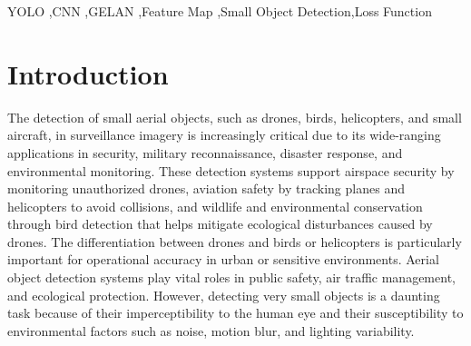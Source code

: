 \documentclass[preprint,review,12pt]{elsarticle}
\begin{document}
\begin{frontmatter}


\begin{keyword}
YOLO \sep CNN \sep GELAN \sep Feature Map \sep Small Object Detection\sep Loss Function


\end{keyword}

\end{frontmatter}




\section{Introduction}\label{sec1}
The detection of small aerial objects, such as drones, birds, helicopters, and small aircraft, in surveillance imagery is increasingly critical due to its wide-ranging applications in security, military reconnaissance, disaster response, and environmental monitoring. These detection systems support airspace security by monitoring unauthorized drones, aviation safety by tracking planes and helicopters to avoid collisions, and wildlife and environmental conservation through bird detection that helps mitigate ecological disturbances caused by drones. The differentiation between drones and birds or helicopters is particularly important for operational accuracy in urban or sensitive environments. Aerial object detection systems play vital roles in public safety, air traffic management, and ecological protection. However, detecting very small objects is a daunting task because of their imperceptibility to the human eye and their susceptibility to environmental factors such as noise, motion blur, and lighting variability.
\end{document}
